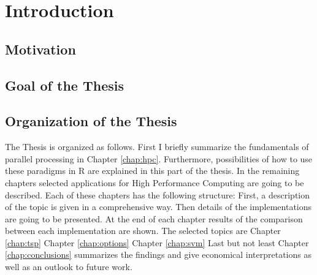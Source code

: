 \chapter{Introduction}
\section{Motivation}
\section{Goal of the Thesis}
\section{Organization of the Thesis}

The Thesis is organized as follows. First I briefly summarize the
fundamentals of parallel processing in Chapter
\ref{chap:hpc}. Furthermore, possibilities of how to
use these paradigms in R are explained in this part of the thesis.
In the remaining
chapters selected applications for High Performance Computing are going to be
described. Each of these chapters has the following structure: First,
a description of the topic is given in a comprehensive way. Then
details of the implementations are going to be presented. At the end of
each chapter results of the comparison between each implementation are
shown.
The selected topics are
Chapter \ref{chap:tsp}
Chapter \ref{chap:options}
Chapter \ref{chap:svm}
Last but not least Chapter \ref{chap:conclusions} summarizes
the findings and give economical interpretations as well as an outlook
to future work.
